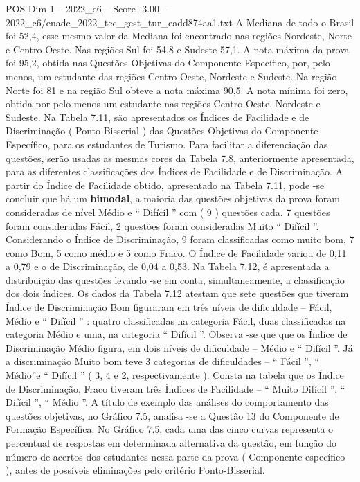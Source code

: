 \begin{textsample}{POS Dim 1 – 2022\_c6 – Score -3.00 – 2022\_c6/enade\_2022\_tec\_gest\_tur\_eadd874aa1.txt}
A Mediana de todo o Brasil foi 52,4, esse mesmo valor da Mediana foi encontrado nas regiões Nordeste, Norte e Centro-Oeste.
Nas regiões Sul foi 54,8 e Sudeste 57,1.
A nota máxima da prova foi 95,2, obtida nas Questões Objetivas do Componente Específico, por, pelo menos, um estudante das regiões Centro-Oeste, Nordeste e Sudeste.
Na região Norte foi 81 e na região Sul obteve a nota máxima 90,5.
A nota mínima foi zero, obtida por pelo menos um estudante nas regiões Centro-Oeste, Nordeste e Sudeste.
Na Tabela 7.11, são apresentados os Índices de Facilidade e de Discriminação ( Ponto-Bisserial ) das Questões Objetivas do Componente Específico, para os estudantes de Turismo.
Para facilitar a diferenciação das questões, serão usadas as mesmas cores da Tabela 7.8, anteriormente apresentada, para as diferentes classificações dos Índices de Facilidade e de Discriminação.
A partir do Índice de Facilidade obtido, apresentado na Tabela 7.11, pode -se concluir que há um \textbf{bimodal}, a maioria das questões objetivas da prova foram consideradas de nível Médio e “ Difícil ” com ( 9 ) questões cada. 7 questões foram consideradas Fácil, 2 questões foram consideradas Muito “ Difícil ”.
Considerando o Índice de Discriminação, 9 foram classificadas como muito bom, 7 como Bom, 5 como médio e 5 como Fraco.
O Índice de Facilidade variou de 0,11 a 0,79 e o de Discriminação, de 0,04 a 0,53.
Na Tabela 7.12, é apresentada a distribuição das questões levando -se em conta, simultaneamente, a classificação dos dois índices.
Os dados da Tabela 7.12 atestam que sete questões que tiveram Índice de Discriminação Bom figuraram em três níveis de dificuldade – Fácil, Médio e “ Difícil ” : quatro classificadas na categoria Fácil, duas classificadas na categoria Médio e uma, na categoria “ Difícil ”.
Observa -se que que os Índice de Discriminação Médio figura, em dois níveis de dificuldade – Médio e “ Difícil ”.
Já a discriminação Muito bom teve 3 categorias de dificuldades – “ Fácil ”, “ Médio”e “ Difícil ” ( 3, 4 e 2, respectivamente ).
Consta na tabela que os Índice de Discriminação, Fraco tiveram três Índices de Facilidade – “ Muito Difícil ”, “ Difícil ”, “ Médio ”.
A título de exemplo das análises do comportamento das questões objetivas, no Gráfico 7.5, analisa -se a Questão 13 do Componente de Formação Específica.
No Gráfico 7.5, cada uma das cinco curvas representa o percentual de respostas em determinada alternativa da questão, em função do número de acertos dos estudantes nessa parte da prova ( Componente específico ), antes de possíveis eliminações pelo critério Ponto-Bisserial.

\end{textsample}
